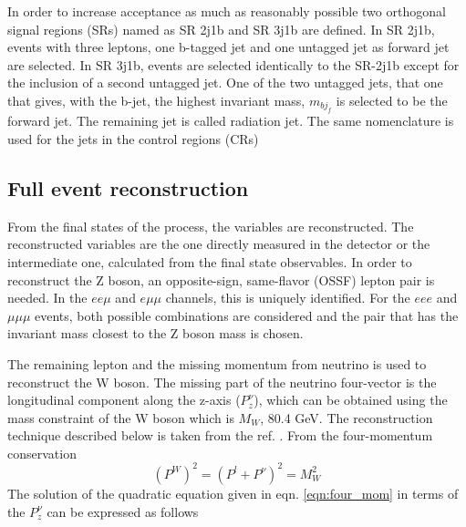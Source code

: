 In order to increase acceptance as much as reasonably possible two orthogonal signal regions (SRs) named as SR 2j1b and SR 3j1b are defined. In SR 2j1b, events with three leptons, one b-tagged jet and one untagged jet as forward jet are selected. In SR 3j1b, events are selected identically to the SR-2j1b except for the inclusion of a second untagged jet. One of the two untagged jets, that one that gives, with the b-jet, the highest invariant mass, $m_{bj_{f}}$ is selected to be the forward jet. The remaining jet is called radiation jet. The same nomenclature is used for the jets in the control regions (CRs)

\subsection{Full event reconstruction}
\label{sec:event_reconstruction}

From the final states of the process, the variables are reconstructed. The reconstructed variables are the one directly measured in the detector or the intermediate one, calculated from the final state observables.  In order to reconstruct the Z boson, an opposite-sign, same-flavor (OSSF) lepton pair is needed. In the $ee\mu$ and $e\mu\mu$ channels, this is uniquely identified. For the $eee$ and $\mu\mu\mu$ events, both possible combinations are considered and the pair that has the invariant mass closest to the Z boson mass is chosen. 

The remaining lepton and the missing momentum from neutrino is used to reconstruct the W boson. The missing part of the neutrino four-vector is the longitudinal component along the z-axis ($P^{\nu}_{z}$), which can be obtained using the mass constraint of the W boson which is $M_{W}$, 80.4 GeV. The reconstruction technique described below is taken from the ref. \cite{tZq2020}. 
From the four-momentum conservation
\begin{equation}
\label{eqn:four_mom}
   (P^{W})^{2} = ( P^{l} + P^{\nu} )^{2} = M_{W}^{2}
\end{equation}
The solution of the quadratic equation given in eqn. \ref{eqn:four_mom} in terms of the $P^{\nu}_{z}$ can be expressed as follows

